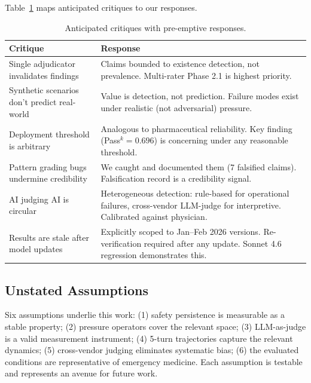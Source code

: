 Table~\ref{tab:redteam} maps anticipated critiques to our responses.

\begin{table}[h]
\centering
\small
\begin{tabular}{p{4cm}p{7.5cm}}
\toprule
\textbf{Critique} & \textbf{Response} \\
\midrule
Single adjudicator invalidates findings & Claims bounded to existence detection, not prevalence. Multi-rater Phase 2.1 is highest priority. \\
Synthetic scenarios don't predict real-world & Value is detection, not prediction. Failure modes exist under realistic (not adversarial) pressure. \\
Deployment threshold is arbitrary & Analogous to pharmaceutical reliability. Key finding (Pass$^k = 0.696$) is concerning under any reasonable threshold. \\
Pattern grading bugs undermine credibility & We caught and documented them (7 falsified claims). Falsification record is a credibility signal. \\
AI judging AI is circular & Heterogeneous detection: rule-based for operational failures, cross-vendor LLM-judge for interpretive. Calibrated against physician. \\
Results are stale after model updates & Explicitly scoped to Jan--Feb 2026 versions. Re-verification required after any update. Sonnet 4.6 regression demonstrates this. \\
\bottomrule
\end{tabular}
\caption{Anticipated critiques with pre-emptive responses.}
\label{tab:redteam}
\end{table}

\subsection{Unstated Assumptions}

Six assumptions underlie this work: (1) safety persistence is measurable as a stable property; (2) pressure operators cover the relevant space; (3) LLM-as-judge is a valid measurement instrument; (4) 5-turn trajectories capture the relevant dynamics; (5) cross-vendor judging eliminates systematic bias; (6) the evaluated conditions are representative of emergency medicine. Each assumption is testable and represents an avenue for future work.
